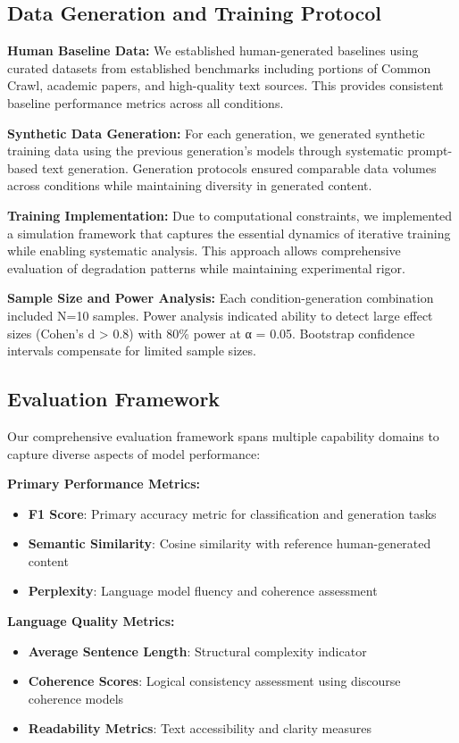 \documentclass[11pt]{article}
\begin{document}
\subsection{Data Generation and Training Protocol}

\textbf{Human Baseline Data:} We established human-generated baselines using curated datasets from established benchmarks including portions of Common Crawl, academic papers, and high-quality text sources. This provides consistent baseline performance metrics across all conditions.

\textbf{Synthetic Data Generation:} For each generation, we generated synthetic training data using the previous generation's models through systematic prompt-based text generation. Generation protocols ensured comparable data volumes across conditions while maintaining diversity in generated content.

\textbf{Training Implementation:} Due to computational constraints, we implemented a simulation framework that captures the essential dynamics of iterative training while enabling systematic analysis. This approach allows comprehensive evaluation of degradation patterns while maintaining experimental rigor.

\textbf{Sample Size and Power Analysis:} Each condition-generation combination included N=10 samples. Power analysis indicated ability to detect large effect sizes (Cohen's d > 0.8) with 80\% power at α = 0.05. Bootstrap confidence intervals compensate for limited sample sizes.

\subsection{Evaluation Framework}

Our comprehensive evaluation framework spans multiple capability domains to capture diverse aspects of model performance:

\textbf{Primary Performance Metrics:}
\begin{itemize}
    \item \textbf{F1 Score}: Primary accuracy metric for classification and generation tasks
    \item \textbf{Semantic Similarity}: Cosine similarity with reference human-generated content
    \item \textbf{Perplexity}: Language model fluency and coherence assessment
\end{itemize}

\textbf{Language Quality Metrics:}
\begin{itemize}
    \item \textbf{Average Sentence Length}: Structural complexity indicator
    \item \textbf{Coherence Scores}: Logical consistency assessment using discourse coherence models
    \item \textbf{Readability Metrics}: Text accessibility and clarity measures
\end{itemize}
\end{document}
